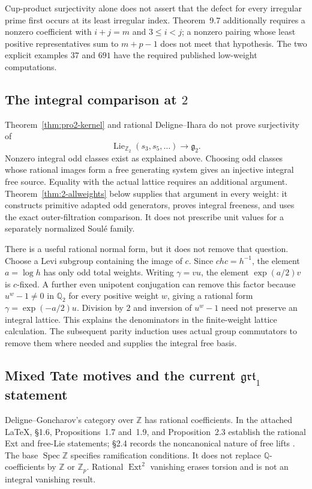 \documentclass[11pt,a4paper]{article}
\theoremstyle{definition}
\begin{document}
Cup-product surjectivity alone does not assert that the defect for
every irregular prime first occurs at its least irregular index.
Theorem~9.7 additionally requires a nonzero coefficient with
$i+j=m$ and $3\le i<j$; a nonzero pairing whose least positive
representatives sum to $m+p-1$ does not meet that hypothesis.
The two explicit examples $37$ and $691$ have the required
published low-weight computations.

\subsection{The integral comparison at \texorpdfstring{$2$}{2}}

Theorem~\ref{thm:pro2-kernel} and rational Deligne--Ihara do not prove surjectivity of
\[
 \operatorname{Lie}_{\mathbb Z_2}(s_3,s_5,\ldots)
      \longrightarrow\mathfrak g_2.
\]
Nonzero integral odd classes exist as explained above. Choosing odd classes whose rational images form a free generating system gives an injective integral free source. Equality with the actual lattice requires an additional argument. Theorem~\ref{thm:2-allweights} below supplies that argument in every weight: it constructs primitive adapted odd generators, proves integral freeness, and uses the exact outer-filtration comparison. It does not prescribe unit values for a separately normalized Soul\'e family.

There is a useful rational normal form, but it does not remove that question. Choose a Levi subgroup containing the image of $c$. Since $chc=h^{-1}$, the element $a=\log h$ has only odd total weights. Writing $\gamma=vu$, the element $\exp(a/2)v$ is $c$-fixed. A further even unipotent conjugation can remove this factor because $u^w-1\neq0$ in $\mathbb Q_2$ for every positive weight $w$, giving a rational form $\gamma=\exp(-a/2)u$. Division by $2$ and inversion of $u^w-1$ need not preserve an integral lattice. This explains the denominators in the finite-weight lattice calculation. The subsequent parity induction uses actual group commutators to remove them where needed and supplies the integral free basis.

\subsection{Mixed Tate motives and the current \texorpdfstring{$\mathfrak{grt}_1$}{grt1} statement}

Deligne--Goncharov's category over $\mathbb Z$ has rational coefficients. In the attached LaTeX, \S1.6, Propositions~1.7 and~1.9, and Proposition~2.3 establish the rational Ext and free-Lie statements; \S2.4 records the noncanonical nature of free lifts \cite{DeligneGoncharov2005}. The base $\operatorname{Spec}\mathbb Z$ specifies ramification conditions. It does not replace $\mathbb Q$-coefficients by $\mathbb Z$ or $\mathbb Z_p$. Rational $\operatorname{Ext}^2$ vanishing erases torsion and is not an integral vanishing result.
\end{document}
